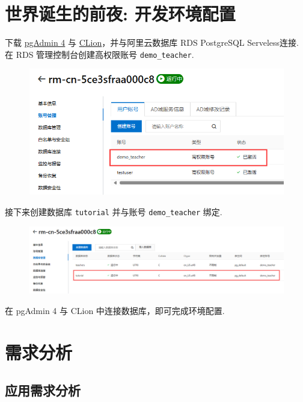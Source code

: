 \documentclass[12pt, oneside]{ctexart}
\numberwithin{figure}{section}
\numberwithin{table}{section}
\begin{document}
\newpage
{}
\setcounter{page}{1}
\tableofcontents
\newpage
\setcounter{page}{1}

\section*{世界诞生的前夜: 开发环境配置}
下载 \href{https://www.pgadmin.org/}{pgAdmin 4} 与 \href{https://www.jetbrains.com/clion/}{CLion}，并与阿里云数据库 RDS PostgreSQL Serveless连接. 在 RDS 管理控制台创建高权限账号 \texttt{demo\_teacher}.
\begin{figure}[!htbp]
    \centering
    \includegraphics[width=13cm]{images/sec0/创建账号.png}
\end{figure}

接下来创建数据库 \texttt{tutorial} 并与账号 \texttt{demo\_teacher} 绑定.
\begin{figure}[!htbp]
    \centering
    \includegraphics[width=13cm]{images/sec0/创建数据库.png}
\end{figure}

在 pgAdmin 4 与 CLion 中连接数据库，即可完成环境配置.

\newpage

\section{需求分析}

\subsection{应用需求分析}
\end{document}
